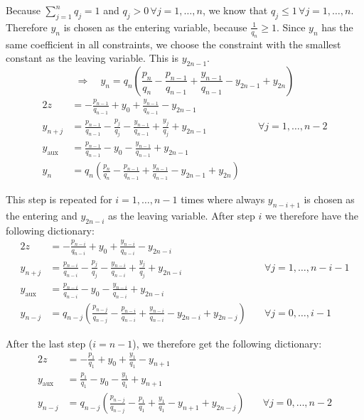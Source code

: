 \documentclass[a4paper,12pt,headsepline]{scrartcl}
\begin{document}
Because $\sum_{j=1}^n q_j=1$ and $q_j>0\,\forall j=1,\dots,n$, we know that $q_j\le1\,\forall j=1,\dots,n$.
Therefore $y_n$ is chosen as the entering variable, because $\frac{1}{q_n}\ge1$.
Since $y_n$ has the same coefficient in all constraints, we choose the constraint with the smallest constant as the leaving variable.
This is $y_{2n-1}$.
\[ \Rightarrow\quad y_n = q_n\left(\frac{p_n}{q_n}-\frac{p_{n-1}}{q_{n-1}}+\frac{y_{n-1}}{q_{n-1}}-y_{2n-1}+y_{2n}\right) \]
\begin{alignat*}{2}
  z            &= -\frac{p_{n-1}}{q_{n-1}}+y_0+\frac{y_{n-1}}{q_{n-1}}-y_{2n-1} \\
  y_{n+j}      &= \frac{p_{n-1}}{q_{n-1}}-\frac{p_j}{q_j}-\frac{y_{n-1}}{q_{n-1}}+\frac{y_j}{q_j}+y_{2n-1} & \quad\forall j=1,\dots,n-2 \\
  y_\text{aux} &= \frac{p_{n-1}}{q_{n-1}}-y_0-\frac{y_{n-1}}{q_{n-1}}+y_{2n-1} \\
  y_n          &= q_n\left(\frac{p_n}{q_n}-\frac{p_{n-1}}{q_{n-1}}+\frac{y_{n-1}}{q_{n-1}}-y_{2n-1}+y_{2n}\right)
\end{alignat*}

This step is repeated for $i=1,\dots,n-1$ times where always $y_{n-i+1}$ is chosen as the entering and $y_{2n-i}$ as the leaving variable.
After step $i$ we therefore have the following dictionary:
\begin{alignat*}{2}
  z            &= -\frac{p_{n-i}}{q_{n-i}}+y_0+\frac{y_{n-i}}{q_{n-i}}-y_{2n-i} \\
  y_{n+j}      &= \frac{p_{n-i}}{q_{n-i}}-\frac{p_j}{q_j}-\frac{y_{n-i}}{q_{n-i}}+\frac{y_j}{q_j}+y_{2n-i} & \quad\forall j=1,\dots,n-i-1 \\
  y_\text{aux} &= \frac{p_{n-i}}{q_{n-i}}-y_0-\frac{y_{n-i}}{q_{n-i}}+y_{2n-i} \\
  y_{n-j}      &= q_{n-j}\left(\frac{p_{n-j}}{q_{n-j}}-\frac{p_{n-i}}{q_{n-i}}+\frac{y_{n-i}}{q_{n-i}}-y_{2n-i}+y_{2n-j}\right) & \quad\forall j=0,\dots,i-1
\end{alignat*}

After the last step ($i=n-1$), we therefore get the following dictionary:
\begin{alignat*}{2}
  z            &= -\frac{p_{1}}{q_{1}}+y_0+\frac{y_{1}}{q_{1}}-y_{n+1} \\
  y_\text{aux} &= \frac{p_{1}}{q_{1}}-y_0-\frac{y_{1}}{q_{1}}+y_{n+1} \\
  y_{n-j}      &= q_{n-j}\left(\frac{p_{n-j}}{q_{n-j}}-\frac{p_{1}}{q_{1}}+\frac{y_{1}}{q_{1}}-y_{n+1}+y_{2n-j}\right) & \quad\forall j=0,\dots,n-2
\end{alignat*}
\end{document}
